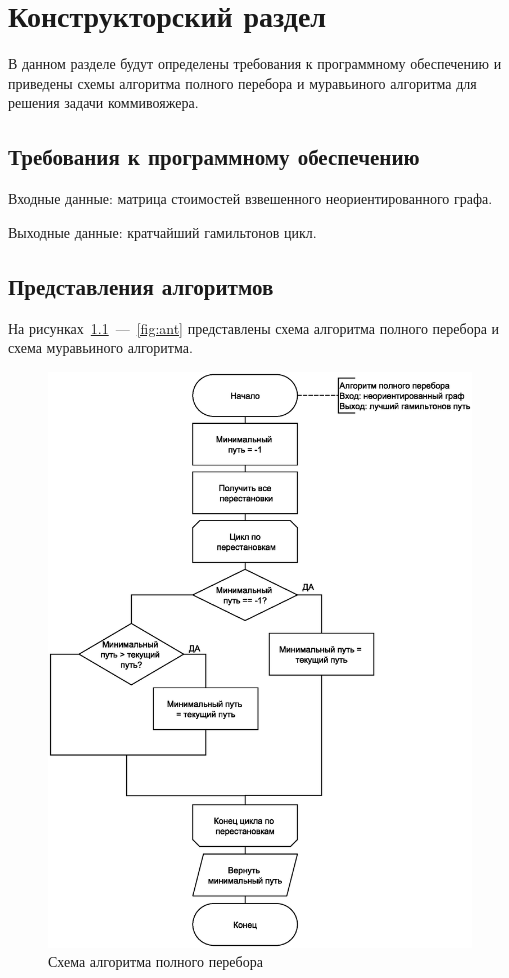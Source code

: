 \chapter{Конструкторский раздел}
В данном разделе будут определены требования к программному обеспечению
и приведены схемы алгоритма полного перебора и муравьиного алгоритма для
решения задачи коммивояжера.

\section{Требования к программному обеспечению}
Входные данные: матрица стоимостей взвешенного неориентированного графа.

Выходные данные: кратчайший гамильтонов цикл.

\section{Представления алгоритмов}
На рисунках~\ref{fig:brute_force}~---~\ref{fig:ant} представлены схема алгоритма полного перебора и схема муравьиного алгоритма.

\begin{figure}[H]
    \centering
    \includegraphics[scale=0.7]{img/unnamed1.eps}
    \caption{Схема алгоритма полного перебора}
    \label{fig:brute_force}
\end{figure}

